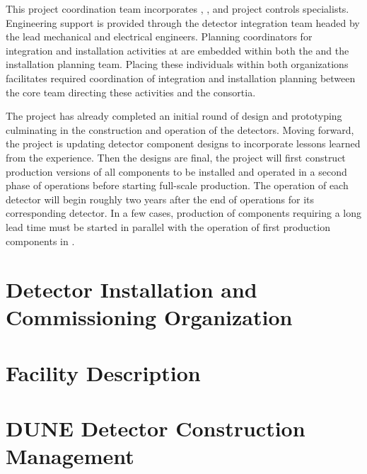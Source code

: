 This project coordination team incorporates , 
, and project controls specialists.  Engineering support 
is provided through the  detector integration team 
headed by the lead  mechanical and electrical engineers.
Planning coordinators for integration and installation activities 
at  are embedded within both the  and the 
 installation planning team.  Placing 
these individuals within both organizations facilitates required 
coordination of integration and installation planning 
between the core team directing these activities and the 
 consortia. %

The  project has already completed an initial round of design 
and prototyping culminating in the construction and operation 
of the  detectors.  Moving forward, the project is 
updating detector component designs to incorporate lessons learned from 
the  experience.  Then the designs are final, the 
project will first construct production versions of all components to be installed and operated in a second phase of  
operations before starting full-scale production.  The operation 
of each  detector will begin roughly two years after
the end of operations for its corresponding  detector.
In a few cases, production of components requiring a long lead time must 
be started in parallel with the operation of first production components 
in .

\section{Detector Installation and Commissioning Organization}
\label{sec:es-tc-det-instal}

\section{Facility Description}
\label{sec:es-tc-facility}

\section{DUNE Detector Construction Management}
\label{sec:es-tc-det-mgmt}


